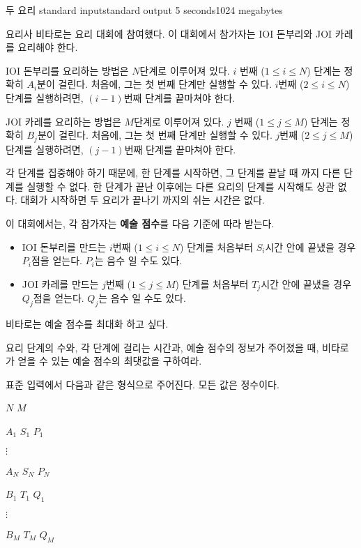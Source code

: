 \begin{problem}{두 요리}
	{standard input}{standard output}
	{5 seconds}{1024 megabytes}{}
	
	요리사 비타로는 요리 대회에 참여했다. 이 대회에서 참가자는 IOI 돈부리와 JOI 카레를 요리해야 한다.
	
	IOI 돈부리를 요리하는 방법은 $N$단계로 이루어져 있다. $i$ 번째 ($1 \le i \le N$) 단계는 정확히 $A_i$분이 걸린다. 처음에, 그는 첫 번째 단계만 실행할 수 있다. $i$번째 ($2 \le i \le N$) 단계를 실행하려면, $(i-1)$번째 단계를 끝마쳐야 한다.
	
	JOI 카레를 요리하는 방법은 $M$단계로 이루어져 있다. $j$ 번째 ($1 \le j \le M$) 단계는 정확히 $B_j$분이 걸린다. 처음에, 그는 첫 번째 단계만 실행할 수 있다. $j$번째 ($2 \le j \le M$) 단계를 실행하려면, $(j-1)$번째 단계를 끝마쳐야 한다.
	
	각 단계를 집중해야 하기 때문에, 한 단계를 시작하면, 그 단계를 끝날 때 까지 다른 단계를 실행할 수 없다. 한 단계가 끝난 이후에는 다른 요리의 단계를 시작해도 상관 없다. 대회가 시작하면 두 요리가 끝나기 까지의 쉬는 시간은 없다.
	
	이 대회에서는, 각 참가자는 \textbf{예술 점수}를 다음 기준에 따라 받는다.
	
	\begin{itemize}
		\item IOI 돈부리를 만드는 $i$번째 ($1 \le i \le N$) 단계를 처음부터 $S_i$시간 안에 끝냈을 경우 $P_i$점을 얻는다. $P_i$는 음수 일 수도 있다.
		\item JOI 카레를 만드는 $j$번째 ($1 \le j \le M$) 단계를 처음부터 $T_j$시간 안에 끝냈을 경우 $Q_j$점을 얻는다. $Q_j$는 음수 일 수도 있다.
	\end{itemize} 

	비타로는 예술 점수를 최대화 하고 싶다.
	
	요리 단계의 수와, 각 단계에 걸리는 시간과, 예술 점수의 정보가 주어졌을 때, 비타로가 얻을 수 있는 예술 점수의 최댓값을 구하여라.
	
	\InputFile
	
	표준 입력에서 다음과 같은 형식으로 주어진다. 모든 값은 정수이다.
	
	$N$ $M$
	
	$A_1$ $S_1$ $P_1$
	
	$\vdots$
	
	$A_N$ $S_N$ $P_N$
		
	$B_1$ $T_1$ $Q_1$
	
	$\vdots$
	
	$B_M$ $T_M$ $Q_M$
	
	\OutputFile
	

\end{problem}
